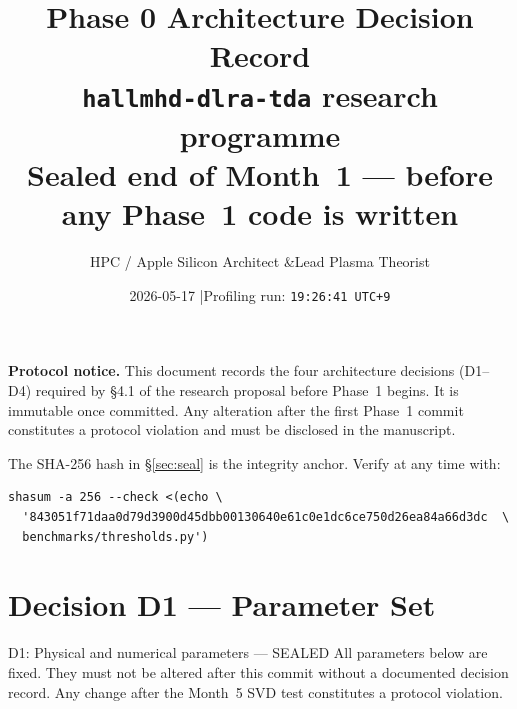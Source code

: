 \documentclass[11pt, a4paper]{article}
\begin{document}

\title{%
  \textbf{Phase 0 Architecture Decision Record}\\[4pt]
  \large \texttt{hallmhd-dlra-tda} research programme\\[6pt]
  \normalsize Sealed end of Month~1 --- before any Phase~1 code is written
}

\author{HPC / Apple Silicon Architect \quad\&\quad Lead Plasma Theorist}

\date{2026-05-17 \quad|\quad Profiling run: \texttt{19:26:41 UTC+9}}

\maketitle
\thispagestyle{empty}

\begin{warnbox}
\textbf{Protocol notice.}
This document records the four architecture decisions (D1--D4) required by
\S4.1 of the research proposal before Phase~1 begins.  It is immutable once
committed.  Any alteration after the first Phase~1 commit constitutes a
protocol violation and must be disclosed in the manuscript.

The SHA-256 hash in \S\ref{sec:seal} is the integrity anchor.
Verify at any time with:
\begin{lstlisting}
shasum -a 256 --check <(echo \
  '843051f71daa0d79d3900d45dbb00130640e61c0e1dc6ce750d26ea84a66d3dc  \
  benchmarks/thresholds.py')
\end{lstlisting}
\end{warnbox}

\tableofcontents
\newpage

\section{Decision D1 --- Parameter Set}
\label{sec:d1}

\begin{sealbox}{D1: Physical and numerical parameters --- SEALED}
All parameters below are fixed.  They must not be altered after this
commit without a documented decision record.  Any change after the
Month~5 SVD test constitutes a protocol violation.
\end{sealbox}
\end{document}
